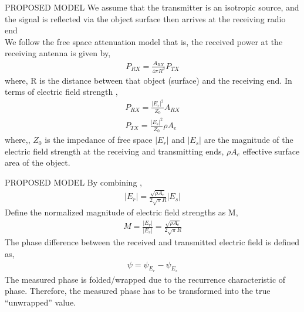 \documentclass{beamer}
\begin{document}
\begin{frame}{PROPOSED MODEL}
We assume that the transmitter is an isotropic source, and
the signal is reflected via the object surface then arrives at the receiving
radio end\\
We follow the free space attenuation model  that is, the received power at the
receiving antenna is given by,
\begin{align}
    P_{RX} = \frac{A_{RX}}{4\pi R^2} P_{TX}
\end{align}
where, R is the distance between that object (surface) and the receiving end.
 In terms of electric field strength ,
 \begin{align}
      P_{RX} = \frac{\lvert E_{r} \rvert ^2}{Z_{0}} A_{RX}\\
      P_{TX} = \frac{\lvert E_{s} \rvert ^2}{Z_{0}} \rho A_{e}
 \end{align}
 where,, $Z_0$ is the impedance of free space $\lvert E_{r} \rvert $ and $\lvert E_{s} \rvert $ are the magnitude of the electric field
strength at the receiving and transmitting ends, $\rho A_{e}$ effective surface area of the object.
 \end{frame}
 \begin{frame}{PROPOSED MODEL}
 By combining ,
 \begin{align}
     \lvert E_{r} \rvert = \frac{\sqrt{\rho A_{e}}}{2\sqrt{\pi} R} \lvert E_{s} \rvert
 \end{align}
 Define the normalized magnitude of electric field strengths as
M, 
\begin{align}
     M = \frac{\lvert E_{r} \rvert}{\lvert E_{s} \rvert} = \frac{\sqrt{\rho A_{e}}}{2\sqrt{\pi} R}
\end{align}
The phase difference between the received and
transmitted electric field is defined as,
\begin{align}
    \psi = \psi_{E_{r}} - \psi_{E_{s}} 
\end{align}
The measured phase is folded/wrapped due to the recurrence
characteristic of phase. Therefore, the measured phase has to
be transformed into the true “unwrapped” value.

    
\end{frame}
\end{document}
